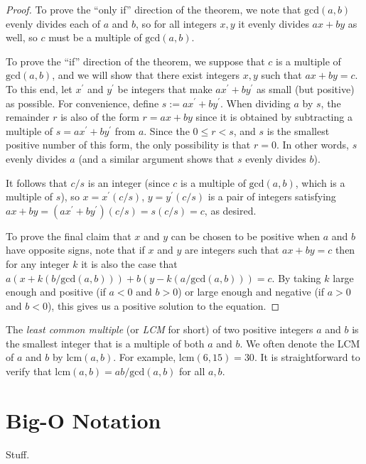 \begin{proof}
	To prove the ``only if'' direction of the theorem, we note that $\mathrm{gcd}(a,b)$ evenly divides each of $a$ and $b$, so for all integers $x,y$ it evenly divides $ax + by$ as well, so $c$ must be a multiple of $\mathrm{gcd}(a,b)$.
	
	To prove the ``if'' direction of the theorem, we suppose that $c$ is a multiple of $\mathrm{gcd}(a,b)$, and we will show that there exist integers $x,y$ such that $ax+by = c$. To this end, let $x^\prime$ and $y^\prime$ be integers that make $ax^\prime + by^\prime$ as small (but positive) as possible. For convenience, define $s := ax^\prime + by^\prime$. When dividing $a$ by $s$, the remainder $r$ is also of the form $r = ax + by$ since it is obtained by subtracting a multiple of $s = ax^\prime + by^\prime$ from $a$. Since the $0 \leq r < s$, and $s$ is the smallest positive number of this form, the only possibility is that $r = 0$. In other words, $s$ evenly divides $a$ (and a similar argument shows that $s$ evenly divides $b$).
	
	It follows that $c/s$ is an integer (since $c$ is a multiple of $\mathrm{gcd}(a,b)$, which is a multiple of $s$), so $x = x^\prime(c/s)$, $y = y^\prime(c/s)$ is a pair of integers satisfying $ax + by = (ax^\prime + by^\prime)(c/s) = s(c/s) = c$, as desired.
	
	To prove the final claim that $x$ and $y$ can be chosen to be positive when $a$ and $b$ have opposite signs, note that if $x$ and $y$ are integers such that $ax + by = c$ then for any integer $k$ it is also the case that $a(x + k(b/\mathrm{gcd}(a,b))) + b(y - k(a/\mathrm{gcd}(a,b))) = c$. By taking $k$ large enough and positive (if $a < 0$ and $b > 0$) or large enough and negative (if $a > 0$ and $b < 0$), this gives us a positive solution to the equation.
\end{proof}

The \emph{least common multiple} (or \emph{LCM} for short) of two positive integers $a$ and $b$ is the smallest integer that is a multiple of both $a$ and $b$. We often denote the LCM of $a$ and $b$ by $\mathrm{lcm}(a,b)$. For example, $\mathrm{lcm}(6,15) = 30$. It is straightforward to verify that $\mathrm{lcm}(a,b) = ab/\mathrm{gcd}(a,b)$ for all $a,b$.


\section{Big-O Notation}\label{sec:bigO}

Stuff.
